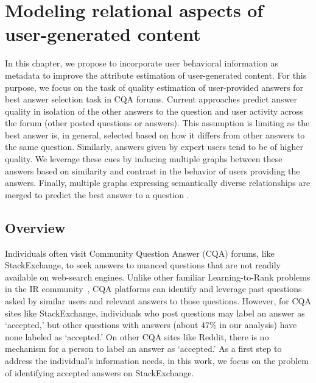 \chapter{Modeling relational aspects of user-generated content}
\label{chap:induced}
In this chapter, we propose to incorporate user behavioral information as metadata to improve the attribute estimation of user-generated content.
For this purpose, we focus on the task of quality estimation of user-provided answers for best answer selection task in CQA forums. Current approaches predict answer quality in isolation of the other answers to the question and user activity across the forum (other posted questions or answers). This assumption is limiting as the best answer is, in general, selected based on how it differs from other answers to the same question. Similarly, answers given by expert users tend to be of higher quality. We leverage these cues by inducing multiple graphs between these answers based on similarity and contrast in the behavior of users providing the answers. Finally, multiple graphs expressing semantically diverse relationships
are merged to predict the best answer to a question \cite{induced}.

\section{Overview}
Individuals often visit Community Question Answer (CQA) forums, like StackExchange, to seek answers to nuanced questions that are not readily available on web-search engines.
Unlike other familiar Learning-to-Rank problems in the IR community~\cite{LambdaMart, LambdaNet}, CQA platforms can identify and leverage past questions asked by similar users and relevant answers to those questions.
However, for CQA sites like StackExchange, individuals who post questions may label an answer as `accepted,' but other questions with answers (about $47$\% in our analysis) have none labeled as `accepted.' On other CQA sites like Reddit, there is no mechanism for a person to label an answer as `accepted.' As a first step to address the individual's information needs, in this work, we focus on the problem of identifying accepted answers on StackExchange.

